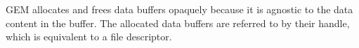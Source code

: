 GEM allocates and frees data buffers opaquely because it is agnostic to the data content in the buffer. %
%
The allocated data buffers are referred to by their handle, which is equivalent to a file descriptor. %


\noindent\begin{minipage}{\textwidth}
    \captionsetup{position=above}
    \centering    
    \resizebox{\textwidth}{!}{
    
    }      
    \label{table:benchmark}
    \vspace{1.5em}
\end{minipage}

%     

